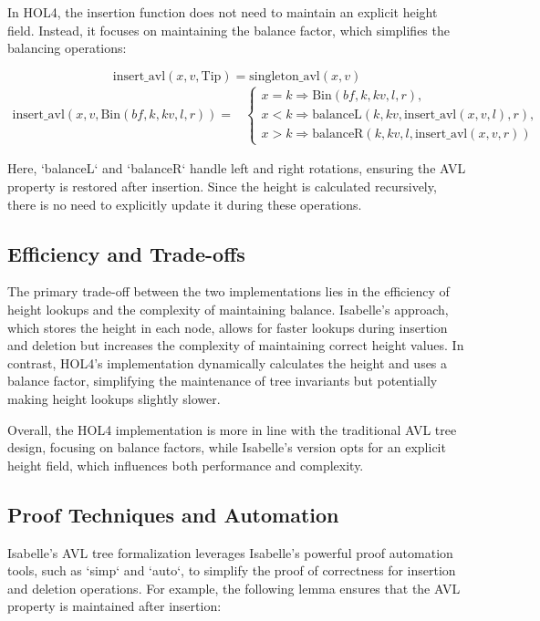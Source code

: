 In HOL4, the insertion function does not need to maintain an explicit height field. Instead, it focuses on maintaining the balance factor, which simplifies the balancing operations:

\[
\text{insert\_avl}(x, v, \text{Tip}) = \text{singleton\_avl}(x, v)
\]
\begin{align*}
	\text{insert\_avl}(x, v, \text{Bin}(bf, k, kv, l, r)) = 
	& \begin{cases}
		x = k \Rightarrow \text{Bin}(bf, k, kv, l, r), \\
		x < k \Rightarrow \text{balanceL}(k, kv, \text{insert\_avl}(x, v, l), r), \\
		x > k \Rightarrow \text{balanceR}(k, kv, l, \text{insert\_avl}(x, v, r))
	\end{cases}
\end{align*}

Here, `balanceL` and `balanceR` handle left and right rotations, ensuring the AVL property is restored after insertion. Since the height is calculated recursively, there is no need to explicitly update it during these operations.

\subsection{Efficiency and Trade-offs}

The primary trade-off between the two implementations lies in the efficiency of height lookups and the complexity of maintaining balance. Isabelle's approach, which stores the height in each node, allows for faster lookups during insertion and deletion but increases the complexity of maintaining correct height values. In contrast, HOL4’s implementation dynamically calculates the height and uses a balance factor, simplifying the maintenance of tree invariants but potentially making height lookups slightly slower.

Overall, the HOL4 implementation is more in line with the traditional AVL tree design, focusing on balance factors, while Isabelle’s version opts for an explicit height field, which influences both performance and complexity.

\subsection{Proof Techniques and Automation}
Isabelle’s AVL tree formalization leverages Isabelle’s powerful proof automation tools, such as `simp` and `auto`, to simplify the proof of correctness for insertion and deletion operations. For example, the following lemma ensures that the AVL property is maintained after insertion:

